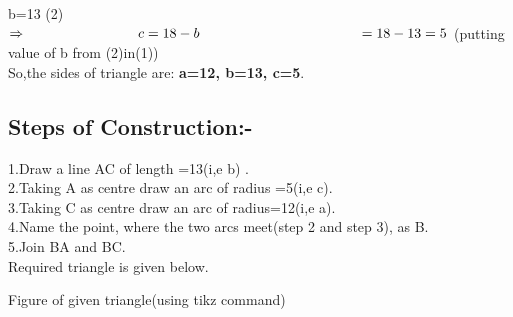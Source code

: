 \documentclass[a4paper,12pt]{article}
\begin{document}
\vspace*{0.3cm}

\hspace*{3cm} b=13 \hspace*{2cm}(2)\\

$\Rightarrow \hspace*{2.8cm} c=18-b \\
 \hspace*{4cm}=18-13 = 5$    \hspace*{1cm}(putting value of b from (2)in(1))\\



{\large So,the sides of triangle are:\textbf{ a=12,   b=13,  c=5}.}\\

\vspace*{1cm}

\subsection*{Steps of Construction:-}
 \hspace*{0.7cm }1.Draw a line AC of length =13(i,e b) .\\
	 
	 2.Taking A as centre draw an arc of radius =5(i,e c).\\
	 
	 3.Taking C as centre draw an arc of radius=12(i,e a).\\
	 
	 4.Name the point, where the two arcs meet(step 2 and step 3), as B.\\
	 
	 5.Join BA and BC.\\

      Required triangle is given below.



\hspace*{3cm} Figure of given triangle(using tikz command)
 
\end{document}
